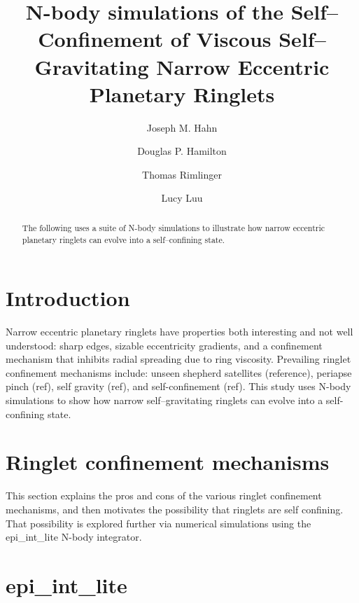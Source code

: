 \documentclass[preprint]{aastex62}
\begin{document}
\title{N-body simulations of the Self--Confinement of 
Viscous Self--Gravitating Narrow Eccentric Planetary Ringlets}


\author{Joseph M. Hahn}

\author{Douglas P. Hamilton}

\author{Thomas Rimlinger}

\author{Lucy Luu}


\begin{abstract}

The following uses a suite of N-body simulations
to illustrate how narrow eccentric planetary ringlets can evolve into a 
self--confining state.

\end{abstract}




\section{Introduction}
\label{sec:intro}

Narrow eccentric planetary ringlets have properties both interesting and
not well understood: sharp edges,
sizable eccentricity gradients, and a confinement mechanism that
inhibits radial spreading due to ring viscosity.
Prevailing ringlet confinement mechanisms include: 
unseen shepherd satellites (reference), periapse pinch (ref), self gravity (ref), and
self-confinement (ref). This study uses N-body simulations to show how narrow
self--gravitating ringlets can evolve into a self-confining state.

\section{Ringlet confinement mechanisms}
\label{sec:confinement}

This section explains the pros and cons of the various ringlet confinement mechanisms,
and then motivates the possibility that ringlets are self confining. That possibility
is explored further via numerical simulations using the epi\_int\_lite N-body integrator.

\section{epi\_int\_lite}
\label{sec:epi_int_lite}
\end{document}
